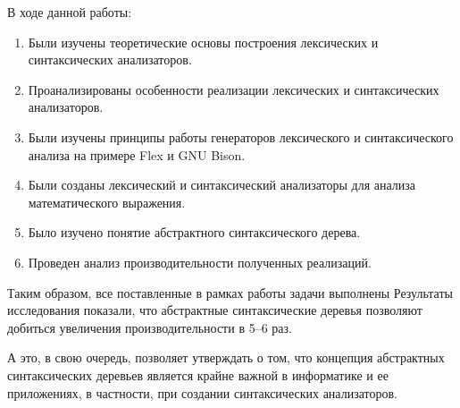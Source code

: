 В ходе данной работы:
\begin{enumerate}
    \item Были изучены теоретические основы построения лексических и 
    синтаксических анализаторов.
    \item Проанализированы особенности реализации лексических и синтаксических 
    анализаторов.
    \item Были изучены принципы работы генераторов лексического и 
    синтаксического анализа на примере Flex и GNU Bison. 
    \item Были созданы лексический и синтаксический анализаторы для анализа
    математического выражения.
    \item Было изучено понятие абстрактного синтаксического дерева.
    \item Проведен анализ производительности полученных реализаций.    
\end{enumerate}
Таким образом, все поставленные в рамках работы задачи выполнены
Результаты исследования показали, что абстрактные синтаксические деревья 
позволяют добиться увеличения производительности в 5--6 раз.

А это, в свою очередь, позволяет утверждать о том, что концепция абстрактных 
синтаксических деревьев является крайне важной в информатике и ее приложениях, 
в частности, при создании синтаксических анализаторов.